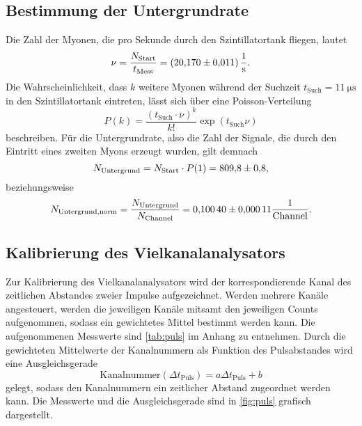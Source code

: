 \subsection{Bestimmung der Untergrundrate}\label{chap:Untergrund}
Die Zahl der Myonen, die pro Sekunde durch den Szintillatortank fliegen, lautet
\begin{equation*}
  \nu = \frac{N_\mathrm{Start}}{t_\mathrm{Mess}} = \SI{20.17 \pm 0.011}{\per\second}.
\end{equation*}
Die Wahrscheinlichkeit, dass $k$ weitere Myonen während der Suchzeit $t_\mathrm{Such} = \SI{11}{\micro\second}$ in den Szintillatortank eintreten, lässt sich über eine Poisson-Verteilung
\begin{equation*}
  P(k) = \frac{(t_\mathrm{Such} \cdot \nu)^k}{k!} \exp (t_\mathrm{Such} \nu)
\end{equation*}
beschreiben.
Für die Untergrundrate, also die Zahl der Signale, die durch den Eintritt eines zweiten Myons erzeugt wurden, gilt demnach
\begin{equation*}
  N_\mathrm{Untergrund} = N_\mathrm{Start} \cdot P(1) = \num{809.8 \pm 0.8},
\end{equation*}
beziehungsweise
\begin{equation*}
  N_\mathrm{Untergrund,norm} = \frac{N_\mathrm{Untergrund}}{N_\mathrm{Channel}} = \num{0.1004 \pm 0.00011} \frac{1}{\mathrm{Channel}}.
\end{equation*}

\subsection{Kalibrierung des Vielkanalanalysators}\label{chap:MCA}
%
Zur Kalibrierung des Vielkanalanalysators wird der korrespondierende Kanal des zeitlichen Abstandes zweier Impulse aufgezeichnet. Werden mehrere Kanäle angesteuert, werden die jeweiligen Kanäle mitsamt den jeweiligen Counts aufgenommen, sodass ein gewichtetes Mittel bestimmt werden kann. Die aufgenommenen Messwerte sind \autoref{tab:puls} im Anhang zu entnehmen. Durch die gewichteten Mittelwerte der Kanalnummern als Funktion des Pulsabstandes wird eine Ausgleichsgerade
\begin{equation*}
  \mathrm{Kanalnummer} (\Delta t_\mathrm{Puls}) = a \Delta t_\mathrm{Puls} + b
\end{equation*}
gelegt, sodass den Kanalnummern ein zeitlicher Abstand zugeordnet werden kann. Die Messwerte und die Ausgleichsgerade sind in \autoref{fig:puls} grafisch dargestellt.

